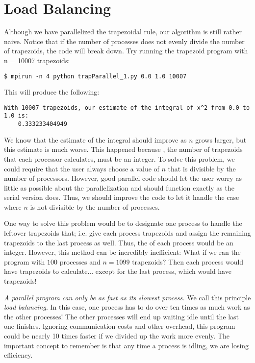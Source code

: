 \section*{Load Balancing}
Although we have parallelized the trapezoidal rule, our algorithm is still rather naive. Notice that if the number of processes does not evenly divide the number of trapezoids, the code will break down. Try running the trapezoid program with n = 10007 trapezoids:
\begin{lstlisting}[style=ShellInput]
$ mpirun -n 4 python trapParallel_1.py 0.0 1.0 10007
\end{lstlisting}
This will produce the following:
\begin{lstlisting}[style=ShellOutput]
With 10007 trapezoids, our estimate of the integral of x^2 from 0.0 to 1.0 is:
    0.333233404949
\end{lstlisting}

We know that the estimate of the integral should improve as $n$ grows larger, but this estimate is much worse. This happened because , the number of trapezoids that each processor calculates, must be an integer. To solve this problem, we could require that the user always choose a value of $n$ that is divisible by the number of processors. However, good parallel code should let the user worry as little as possible about the parallelization and should function exactly as the serial version does. Thus, we should improve the code to let it handle the case where $n$ is not divisible by the number of processes.

One way to solve this problem would be to designate one process to handle the leftover trapezoids that; i.e. give each process  trapezoids and assign the remaining  trapezoids to the last process as well. Thus, the  of each process would be an integer. However, this method can be incredibly inefficient: What if we ran the program with $100$ processes and $n=1099$ trapezoids? Then each process would have  trapezoids to calculate... except for the last process, which would have  trapezoids!

\emph{A parallel program can only be as fast as its slowest process.} We call this principle \emph{load balancing}. In this case, one process has to do over ten times as much work as the other processes! The other processes will end up waiting idle until the last one finishes. Ignoring communication costs and other overhead, this program could be nearly 10 times faster if we divided up the work more evenly. The important concept to remember is that any time a process is idling, we are losing efficiency.

